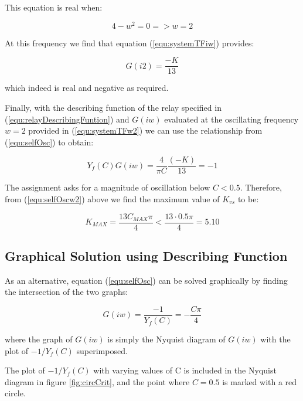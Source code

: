 \documentclass[a4paper, titlepage]{article}
\begin{document}
This equation is real when:

\begin{equation}
4-w^2 = 0 => w=2
\label{equ:systemTFreal}
\end{equation}

At this frequency we find that equation (\ref{equ:systemTFiw}) provides:

\begin{equation}
G(i2) = \frac{-K}{13}
\label{equ:systemTFw2}
\end{equation}

which indeed is real and negative as required.

Finally, with the describing function of the relay specified in  (\ref{equ:relayDescribingFuntion}) and $G(iw)$ evaluated at the oscillating frequency $w=2$ provided in (\ref{equ:systemTFw2}) we can use the relationship from (\ref{equ:selfOsc}) to obtain:

\begin{equation}
Y_{f}(C)G(iw) = \frac{4}{\pi C}\frac{(-K)}{13} = -1
\label{equ:selfOscw2}
\end{equation}

The assignment asks for a magnitude of oscillation below $C < 0.5$.
Therefore, from (\ref{equ:selfOscw2}) above we find the maximum value of $K_{vs}$ to be:

\begin{equation}
K_{MAX} = \frac{13C_{MAX}\pi}{4} < \frac{13 \cdot 0.5\pi}{4}= 5.10
\label{equ:maximum_k}
\end{equation}

\subsection{Graphical Solution using Describing Function}

As an alternative, equation (\ref{equ:selfOsc}) can be solved graphically by finding the intersection of the two graphs:

\begin{equation}
G(iw) = \frac{-1}{Y_{f}(C)} = -\frac{C\pi}{4}
\end{equation}

where the graph of $G(iw)$ is simply the Nyquist diagram of $G(iw)$ with the plot of $-1/Y_{f}(C)$ superimposed.

The plot of $-1/Y_{f}(C)$ with varying values of C is included in the Nyquist diagram in figure \ref{fig:circCrit}, and the point where $C=0.5$ is marked with a red circle.
\end{document}
